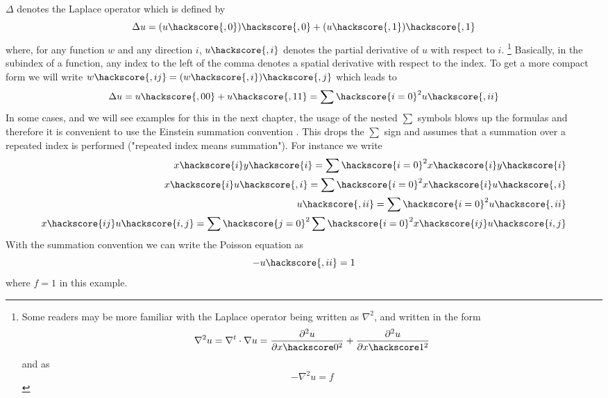 $\Delta$ denotes the Laplace operator which is defined by
\begin{equation}
\Delta u = (u\hackscore {,0})\hackscore{,0}+(u\hackscore{,1})\hackscore{,1}
\label{eq:FirstSteps.1.1}
\end{equation}
where, for any function $w$ and any direction $i$, $u\hackscore{,i}$
denotes the partial derivative  of $u$ with respect to $i$.  
\footnote{Some readers
may be more familiar with the Laplace operator being written
as $\nabla^2$, and written in the form
\begin{equation*}
\nabla^2 u = \nabla^t \cdot \nabla u =  \frac{\partial^2 u}{\partial x\hackscore 0^2} 
+ \frac{\partial^2 u}{\partial  x\hackscore 1^2}
\end{equation*}
and  as
\begin{equation*}
-\nabla^2 u = f
\end{equation*}
}
Basically, in the subindex of a function, any index to the left of the comma denotes a spatial derivative with respect 
to the index. To get a more compact form we will write $w\hackscore{,ij}=(w\hackscore {,i})\hackscore{,j}$
which leads to
\begin{equation}
\Delta u = u\hackscore{,00}+u\hackscore{,11}=\sum\hackscore{i=0}^2 u\hackscore{,ii}
\label{eq:FirstSteps.1.1b}
\end{equation}
In some cases, and we will see examples for this in the next chapter,
the usage of the nested $\sum$ symbols blows up the formulas and therefore
it is convenient to use the Einstein summation convention . This 
drops the $\sum$ sign and assumes that a summation over a repeated index is performed 
("repeated index means summation"). For instance we write
\begin{eqnarray}
x\hackscore{i}y\hackscore{i}=\sum\hackscore{i=0}^2 x\hackscore{i}y\hackscore{i}   \\
x\hackscore{i}u\hackscore{,i}=\sum\hackscore{i=0}^2 x\hackscore{i}u\hackscore{,i}   \\
u\hackscore{,ii}=\sum\hackscore{i=0}^2 u\hackscore{,ii} \\
x\hackscore{ij}u\hackscore{i,j}=\sum\hackscore{j=0}^2\sum\hackscore{i=0}^2 x\hackscore{ij}u\hackscore{i,j}   \\
\label{eq:FirstSteps.1.1c}
\end{eqnarray}
With the summation convention we can write the Poisson equation  as
\begin{equation}
- u\hackscore{,ii} =1 
\label{eq:FirstSteps.1.sum}
\end{equation}
where $f=1$ in this example.

